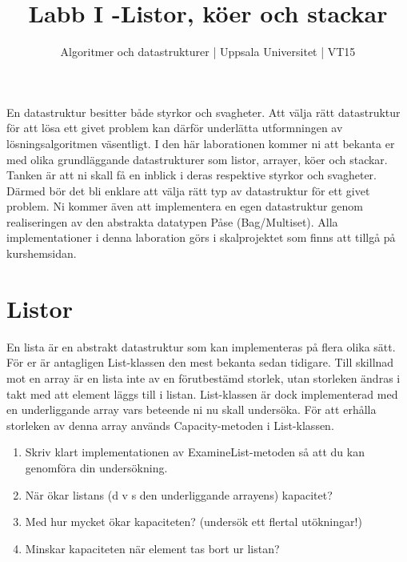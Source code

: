 \documentclass{article}
\begin{document}
  \title{Labb I -Listor, köer och stackar }
  \author{ Algoritmer och datastrukturer | Uppsala Universitet | VT15 }
  \date{}
  \maketitle


  \section*{}
   En datastruktur besitter både styrkor och svagheter. Att välja rätt datastruktur för att
   lösa ett givet problem kan därför underlätta utformningen av lösningsalgoritmen väsentligt.
   I den här laborationen kommer ni att bekanta er med olika grundläggande datastrukturer
   som listor, arrayer, köer och stackar. Tanken är att ni skall få en inblick i deras respektive
   styrkor och svagheter. Därmed bör det bli enklare att välja rätt typ av datastruktur för ett
   givet problem. Ni kommer även att implementera en egen datastruktur genom realiseringen
   av den abstrakta datatypen Påse (Bag/Multiset). Alla implementationer i denna laboration
   görs i skalprojektet som finns att tillgå på kurshemsidan. 



  \section*{Listor
  }

  En lista är en abstrakt datastruktur som kan implementeras på flera olika sätt. För er är
  antagligen List-klassen den mest bekanta sedan tidigare. Till skillnad mot en array är en
  lista inte av en förutbestämd storlek, utan storleken ändras i takt med att element läggs
  till i listan. List-klassen är dock implementerad med en underliggande array vars beteende
  ni nu skall undersöka. För att erhålla storleken av denna array används Capacity-metoden i
  List-klassen.
  
  \begin{enumerate}
    \item Skriv klart implementationen av ExamineList-metoden så att du kan genomföra din
    undersökning.
    \item När ökar listans (d v s den underliggande arrayens) kapacitet?
    \item Med hur mycket ökar kapaciteten? (undersök ett flertal utökningar!)
    \item Minskar kapaciteten när element tas bort ur listan?
  \end{enumerate}
  
\end{document}

